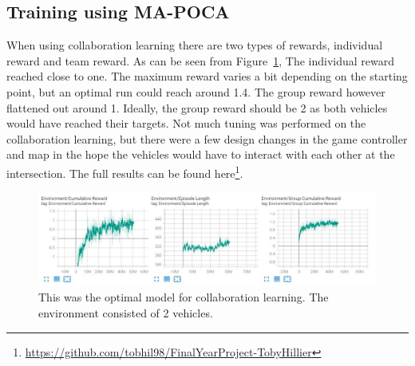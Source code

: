 \subsection{Training using MA-POCA}
When using collaboration learning there are two types of rewards, individual reward and team reward. As can be seen from Figure~\ref{08:Collab},  The individual reward reached close to one. The maximum reward varies a bit depending on the starting point, but an optimal run could reach around 1.4. The group reward however flattened out around 1. Ideally, the group reward should be 2 as both vehicles would have reached their targets. Not much tuning was performed on the collaboration learning, but there were a few design changes in the game controller and map in the hope the vehicles would have to interact with each other at the intersection. The full results can be found here\footnote{\url{https://github.com/tobhil98/FinalYearProject-TobyHillier}}.

\begin{figure}[H]
    \includegraphics[width=1\textwidth]{08_Results/ML-agent results/CollaborationReward.JPG}
    \caption[Collaboration learning]{This was the optimal model for collaboration learning. The environment consisted of 2 vehicles.} \label{08:Collab}
\end{figure}
